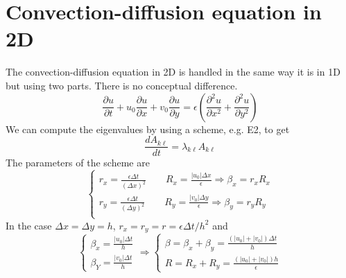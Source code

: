 \documentclass[12pt, openany]{report}
\theoremstyle{definition}
\begin{document}
\section{Convection-diffusion equation in 2D}
The convection-diffusion equation in 2D is handled in the same way it is in 1D but using two parts. There is no conceptual difference. 
\begin{equation}
	\frac{\partial u}{\partial t} + u_0 \frac{\partial u}{\partial x} + v_0 \frac{\partial u}{\partial y} = \epsilon \left(\frac{\partial^2u}{\partial x^2} + \frac{\partial^2 u}{\partial y^2}\right) 
\end{equation}
We can compute the eigenvalues by using a scheme, e.g. E2, to get 
\begin{equation}
	\frac{dA_{k\ell}}{dt} = \lambda_{k\ell} A_{k\ell}
\end{equation}
The parameters of the scheme are 
\begin{equation}
	\begin{cases}
		r_x = \frac{\epsilon \Delta t}{(\Delta x)^2} \qquad R_x = \frac{|u_0| \Delta x}{\epsilon} \Longrightarrow \beta_x = r_xR_x\\
		r_y = \frac{\epsilon \Delta t}{(\Delta y)^2} \qquad R_y = \frac{|v_0| \Delta y}{\epsilon} \Longrightarrow \beta_y = r_yR_y\\
	\end{cases}
\end{equation}
In the case $\Delta x= \Delta y = h$, $r_x=r_y=r=\epsilon \Delta t/ h^2$ and 
\begin{equation}
	\begin{cases}
		\beta_x = \frac{|u_0| \Delta t}{h}\\
		\beta_Y = \frac{|v_0| \Delta t}{h}
	\end{cases} \Longrightarrow \begin{cases}
		\beta = \beta_x + \beta_y = \frac{(|u_0|+|v_0|)\Delta t}{h}\\
		R = R_x+R_y = \frac{(|u_0| + |v_0|)h}{\epsilon}
	\end{cases}
\end{equation}
\end{document}
